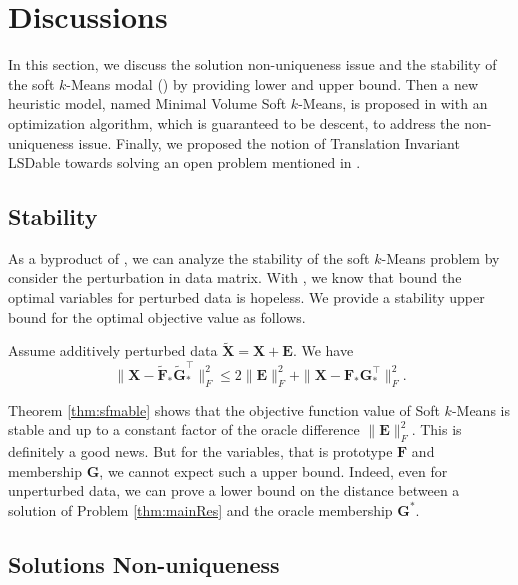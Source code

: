 \documentclass[journal]{IEEEtran}
\begin{document}
\section{Discussions} \label{sec:discuss}
In this section, we discuss the solution non-uniqueness issue and the stability of the soft $k$-Means modal () by providing lower and upper bound. Then a new heuristic model, named Minimal Volume Soft $k$-Means, is proposed in  with an optimization algorithm, which is guaranteed to be descent, to address the non-uniqueness issue. Finally, we proposed the notion of Translation Invariant LSDable towards solving an open problem mentioned in \cite{arora2013similarity}.

\subsection{Stability}\label{sec:stability}
As a byproduct of  ,
we can analyze the stability of the soft $k$-Means problem 
by consider the perturbation in data matrix.
With , we know that bound the optimal variables for perturbed data is hopeless.
We provide a stability upper bound for the optimal objective value as follows.
\begin{thm}[Stability]\label{thm:stability}
	Assume additively perturbed data $\widetilde{\mathbf{X}} = \mathbf{X} + \mathbf{E}$. 
	We have
	\[
	\|\mathbf{X} - \widetilde{\mathbf{F}}_*\widetilde{\mathbf{G}}_*^\top \|_F^2 \leq  2\|\mathbf{E}\|_F^2 + \|\mathbf{X} - \mathbf{F}_*\mathbf{G}_*^\top \|_F^2.
	\]
\end{thm}

\begin{remark}
	Theorem \ref{thm:sfmable} shows that the objective function value of Soft $k$-Means is stable and up to a constant factor of the oracle
	difference $\|\mathbf{E}\|_F^2$. This is definitely a good news.
	But for the variables, that is prototype $\mathbf{F}$ and membership $\mathbf{G}$, we cannot expect such a upper bound.
	Indeed, even for unperturbed data, we can prove a lower bound on the distance between a solution of Problem \eqref{thm:mainRes} and the oracle membership $\mathbf{G}^*$.
\end{remark}

\subsection{Solutions Non-uniqueness}\label{sec:arbitray}
\end{document}
